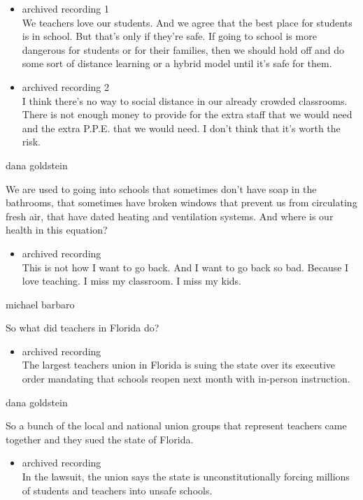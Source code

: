 \begin{itemize}
\item
  archived recording 1\\
  We teachers love our students. And we agree that the best place for
  students is in school. But that's only if they're safe. If going to
  school is more dangerous for students or for their families, then we
  should hold off and do some sort of distance learning or a hybrid
  model until it's safe for them.
\item
  archived recording 2\\
  I think there's no way to social distance in our already crowded
  classrooms. There is not enough money to provide for the extra staff
  that we would need and the extra P.P.E. that we would need. I don't
  think that it's worth the risk.
\end{itemize}

dana goldstein

We are used to going into schools that sometimes don't have soap in the
bathrooms, that sometimes have broken windows that prevent us from
circulating fresh air, that have dated heating and ventilation systems.
And where is our health in this equation?

\begin{itemize}
\tightlist
\item
  archived recording\\
  This is not how I want to go back. And I want to go back so bad.
  Because I love teaching. I miss my classroom. I miss my kids.
\end{itemize}

michael barbaro

So what did teachers in Florida do?

\begin{itemize}
\tightlist
\item
  archived recording\\
  The largest teachers union in Florida is suing the state over its
  executive order mandating that schools reopen next month with
  in-person instruction.
\end{itemize}

dana goldstein

So a bunch of the local and national union groups that represent
teachers came together and they sued the state of Florida.

\begin{itemize}
\tightlist
\item
  archived recording\\
  In the lawsuit, the union says the state is unconstitutionally forcing
  millions of students and teachers into unsafe schools.
\end{itemize}

